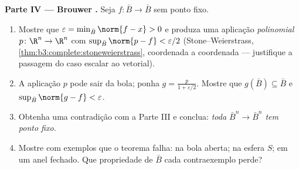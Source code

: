 \begin{problem}
\medskip
\noindent\textbf{Parte IV --- Brouwer .} Seja $f\colon\bar B\to\bar B$  sem
ponto fixo.
\begin{enumerate}[resume]
  \item Mostre que $\varepsilon = \min_{\bar B}\norm{f - x} > 0$ e produza uma aplicação \emph{polinomial} $p\colon\R^n\to
        \R^n$
        com $\sup_{\bar B}\norm{p - f} <
        \varepsilon/2$ (Stone--Weierstrass, \cref{thm:b3:complete:stoneweierstrass}, coordenada a
        coordenada --- justifique a passagem do caso escalar ao
        vetorial).
  \item A aplicação $p$ pode sair da bola; ponha $g = \frac{p}{1
        + \varepsilon/2}$. Mostre que
        $g(\bar B) \subseteq \bar B$ e $\sup_{\bar B}\norm{g - f} < \varepsilon$.
  \item Obtenha uma contradição com a Parte III e conclua: \emph{toda
         $\bar B^n \to \bar B^n$ tem ponto fixo.}
  \item Mostre com exemplos que o teorema falha: na bola aberta; na
        esfera $S$; em um anel fechado. Que propriedade de
        $\bar B$ cada contraexemplo perde?
\end{enumerate}


\end{problem}
